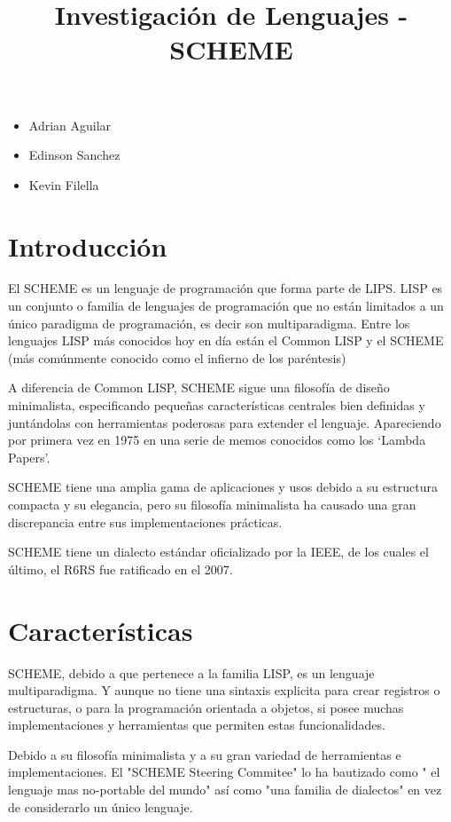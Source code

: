 \documentclass[11pt]{article} %
\title{Investigación de Lenguajes - SCHEME}
\begin{document}
\maketitle
\begin{itemize}
\item Adrian Aguilar
\item Edinson Sanchez
\item Kevin Filella
\end{itemize}

\section{Introducción}
El SCHEME es un lenguaje de programación que forma parte de LIPS. LISP es un conjunto o familia de lenguajes de programación que no están limitados a un único paradigma de programación, es decir son multiparadigma. Entre los lenguajes LISP más conocidos hoy en día están el Common LISP y el SCHEME (más comúnmente conocido como el infierno de los paréntesis)

A diferencia de Common LISP, SCHEME sigue una filosofía de diseño minimalista, especificando pequeñas características centrales bien definidas  y juntándolas con herramientas poderosas para extender el lenguaje. Apareciendo por primera vez en 1975 en una serie de memos conocidos como los ‘Lambda Papers’.

SCHEME tiene una amplia gama de aplicaciones y usos debido a su estructura compacta y su elegancia, pero su filosofía minimalista ha causado una gran discrepancia entre sus implementaciones prácticas.

SCHEME tiene un dialecto estándar oficializado por la IEEE, de los cuales el último, el R6RS fue ratificado en el 2007.

\section{Características}

SCHEME, debido a que pertenece a la familia LISP, es un lenguaje multiparadigma. Y aunque no tiene una sintaxis explicita para crear registros o estructuras, o para la programación orientada a objetos, si posee muchas implementaciones y herramientas que permiten estas funcionalidades.

Debido a su filosofía minimalista y a su gran variedad de herramientas e implementaciones. El  "SCHEME Steering Commitee"  lo ha bautizado como " el lenguaje mas no-portable del mundo"  así como "una familia de dialectos" en vez de considerarlo un único lenguaje.
\end{document}
